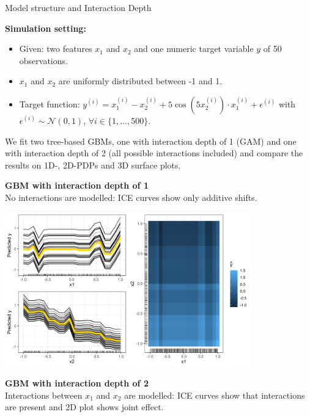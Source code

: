 \begin{vbframe}{Model structure and Interaction Depth}
\framebreak


\textbf{Simulation setting:}
\begin{itemize}
\item Given: two features $x_1$ and $x_2$ and one numeric target variable $y$ of 50 observations.
\item $x_1$ and $x_2$ are uniformly distributed between -1 and 1.
\item Target function: $y^{(i)} = x_1^{(i)} -  x_2^{(i)} + 5\cos(5 x_2^{(i)}) \cdot x_1^{(i)} + \epsilon^{(i)}$ with $\epsilon^{(i)} \sim \mathcal{N}(0, 1)$, $\forall i \in \{1, \dots, 500\}$.
\end{itemize} 

We fit two tree-based GBMs, one with interaction depth of 1 (GAM) and one with interaction depth of 2 (all possible interactions included) and compare the results on 1D-, 2D-PDPs and 3D surface plots.

\framebreak

\textbf{GBM with interaction depth of 1}\\
No interactions are modelled: ICE curves show only additive shifts.

\begin{center}
\includegraphics[width=0.8\textwidth]{figure_man/boosting_interaction_example_gam.PNG}
\end{center}

\textbf{GBM with interaction depth of 2}\\
Interactions between $x_1$ and $x_2$ are modelled: ICE curves show that interactions are present and 2D plot shows joint effect.


\end{vbframe}

